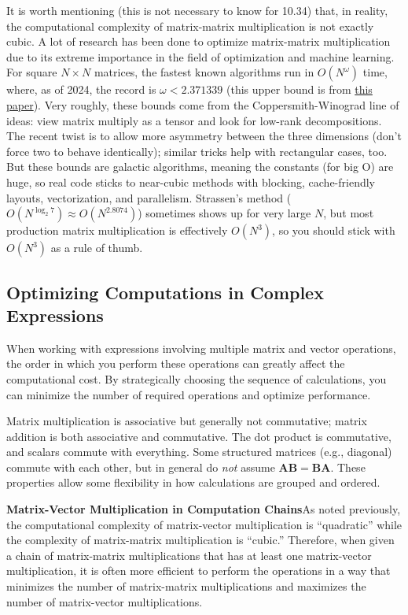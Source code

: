 It is worth mentioning (this is not necessary to know for 10.34) that, in reality, the computational complexity of matrix-matrix multiplication is not exactly cubic. A lot of research has been done to optimize matrix-matrix multiplication due to its extreme importance in the field of optimization and machine learning. For square $N\times N$ matrices, the fastest known algorithms run in $O(N^{\omega})$ time, where, as of 2024, the record is $\omega < 2.371339$ (this upper bound is from \href{https://arxiv.org/abs/2404.16349}{this paper}). Very roughly, these bounds come from the Coppersmith-Winograd line of ideas: view matrix multiply as a tensor and look for low-rank decompositions. The recent twist is to allow more asymmetry between the three dimensions (don't force two to behave identically); similar tricks help with rectangular cases, too. But these bounds are galactic algorithms, meaning the constants (for big O) are huge, so real code sticks to near-cubic methods with blocking, cache-friendly layouts, vectorization, and parallelism. Strassen's method ($O(N^{\log_2 7})\!\approx O(N^{2.8074})$) sometimes shows up for very large $N$, but most production matrix multiplication is effectively $O(N^3)$, so you should stick with $O(N^3)$ as a rule of thumb.


\subsection{Optimizing Computations in Complex Expressions}
When working with expressions involving multiple matrix and vector operations, the order in which you perform these operations can greatly affect the computational cost. By strategically choosing the sequence of calculations, you can minimize the number of required operations and optimize performance.

Matrix multiplication is associative but generally not commutative; matrix addition is both associative and commutative. The dot product is commutative, and scalars commute with everything. Some structured matrices (e.g., diagonal) commute with each other, but in general do \emph{not} assume $ \mathbf{A}\mathbf{B}=\mathbf{B}\mathbf{A} $. These properties allow some flexibility in how calculations are grouped and ordered.

\textbf{Matrix-Vector Multiplication in Computation Chains}\quad As noted previously, the computational complexity of matrix-vector multiplication is ``quadratic'' while the complexity of matrix-matrix multiplication is ``cubic.'' Therefore, when given a chain of matrix-matrix multiplications that has at least one matrix-vector multiplication, it is often more efficient to perform the operations in a way that minimizes the number of matrix-matrix multiplications and maximizes the number of matrix-vector multiplications. 

